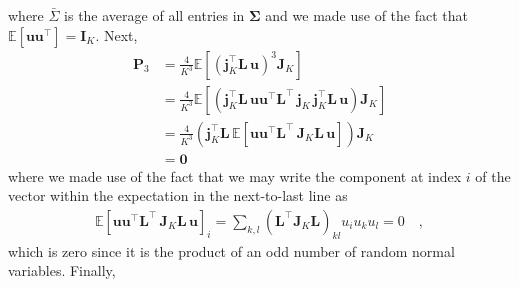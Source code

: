 \documentclass[modern]{aastex62}
\begin{document}
    where $\bar{\Sigma}$ is the average of all entries in $\pmb{\Sigma}$ and
    we made use of the fact that $\mathbb{E}\left[ \mathbf{u} \mathbf{u}^\top\right] = \mathbf{I}_K$.
    Next,
    \begin{align}
        \mathbf{P}_3 & = \frac{4}{K^3}\mathbb{E}\left[ \left(\mathbf{j}_K^\top \mathbf{L} \, \mathbf{u}\right)^3 \mathbf{J}_K \right]
        \nonumber                                                                                                                                                                                                                    \\
                     & = \frac{4}{K^3}\mathbb{E}\left[\left(\mathbf{j}_K^\top \mathbf{L} \,  \mathbf{u} \mathbf{u}^\top  \mathbf{L}^\top \, \mathbf{j}_K \, \mathbf{j}_K^\top \mathbf{L} \,  \mathbf{u} \right) \mathbf{J}_K \right]
        \nonumber                                                                                                                                                                                                                    \\
                     & = \frac{4}{K^3}\left(\mathbf{j}_K^\top \mathbf{L} \,  \mathbb{E}\left[\mathbf{u} \mathbf{u}^\top  \mathbf{L}^\top \, \mathbf{J}_K \mathbf{L} \,  \mathbf{u}\right] \right) \mathbf{J}_K
        \nonumber                                                                                                                                                                                                                    \\
                     & = \mathbf{0}
    \end{align}
    where we made use of the fact that we may write the component at index $i$ of the vector within the expectation in the next-to-last line
    as
    \begin{align}
        \mathbb{E}\left[\mathbf{u} \mathbf{u}^\top  \mathbf{L}^\top \, \mathbf{J}_K \mathbf{L} \,  \mathbf{u}\right]_{i} = \sum\limits_{k,l}(\mathbf{L}^\top \mathbf{J}_K \mathbf{L})_{kl} u_i u_k u_l = 0
        \quad,
        \nonumber
    \end{align}
    which is zero since it is the product of an odd number of random normal variables.
    Finally,
\end{document}
